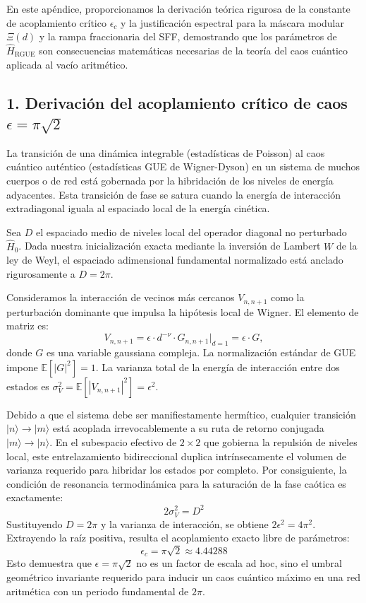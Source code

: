 \documentclass[aps,prl,preprint,superscriptaddress,floatfix]{revtex4-2}
\begin{document}
En este apéndice, proporcionamos la derivación teórica rigurosa de la constante de acoplamiento crítico $\epsilon_c$ y la justificación espectral para la máscara modular $\Xi(d)$ y la rampa fraccionaria del SFF, demostrando que los parámetros de $\hat{H}_{\text{RGUE}}$ son consecuencias matemáticas necesarias de la teoría del caos cuántico aplicada al vacío aritmético.

\subsection{1. Derivación del acoplamiento crítico de caos \texorpdfstring{$\epsilon = \pi\sqrt{2}$}{epsilon}}
La transición de una dinámica integrable (estadísticas de Poisson) al caos cuántico auténtico (estadísticas GUE de Wigner-Dyson) en un sistema de muchos cuerpos o de red está gobernada por la hibridación de los niveles de energía adyacentes. Esta transición de fase se satura cuando la energía de interacción extradiagonal iguala al espaciado local de la energía cinética.

Sea $D$ el espaciado medio de niveles local del operador diagonal no perturbado $\hat{H}_0$. Dada nuestra inicialización exacta mediante la inversión de Lambert $W$ de la ley de Weyl, el espaciado adimensional fundamental normalizado está anclado rigurosamente a $D = 2\pi$.

Consideramos la interacción de vecinos más cercanos $V_{n, n+1}$ como la perturbación dominante que impulsa la hipótesis local de Wigner. El elemento de matriz es:
\begin{equation}
V_{n, n+1} = \epsilon \cdot d^{-\nu} \cdot G_{n, n+1} \bigg|_{d=1} = \epsilon \cdot G,
\end{equation}
donde $G$ es una variable gaussiana compleja. La normalización estándar de GUE impone $\mathbb{E}[|G|^2] = 1$. La varianza total de la energía de interacción entre dos estados es $\sigma_V^2 = \mathbb{E}[|V_{n, n+1}|^2] = \epsilon^2$.

Debido a que el sistema debe ser manifiestamente hermítico, cualquier transición $|n\rangle \to |m\rangle$ está acoplada irrevocablemente a su ruta de retorno conjugada $|m\rangle \to |n\rangle$. En el subespacio efectivo de $2 \times 2$ que gobierna la repulsión de niveles local, este entrelazamiento bidireccional duplica intrínsecamente el volumen de varianza requerido para hibridar los estados por completo. Por consiguiente, la condición de resonancia termodinámica para la saturación de la fase caótica es exactamente:
\begin{equation}
2 \sigma_V^2 = D^2
\end{equation}
Sustituyendo $D = 2\pi$ y la varianza de interacción, se obtiene $2 \epsilon^2 = 4\pi^2$. Extrayendo la raíz positiva, resulta el acoplamiento exacto libre de parámetros:
\begin{equation}
\epsilon_c = \pi\sqrt{2} \approx 4.44288
\end{equation}
Esto demuestra que $\epsilon = \pi\sqrt{2}$ no es un factor de escala ad hoc, sino el umbral geométrico invariante requerido para inducir un caos cuántico máximo en una red aritmética con un periodo fundamental de $2\pi$.
\end{document}
